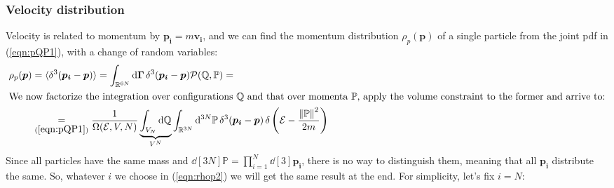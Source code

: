 \documentclass[../template.tex]{subfiles}
\begin{document}
\subsubsection{Velocity distribution} 
Velocity is related to momentum by $\bm{p_i} = m \bm{v_i}$, and we can find the momentum distribution $\rho_p(\bm{p})$ of a single particle from the joint pdf in (\ref{eqn:pQP1}), with a change of random variables:
\begin{align}\nonumber
    \rho_p(\bm{p}) &= \langle \delta^3 (\bm{p_i} - \bm{p}) \rangle = \int_{\mathbb{R}^{6N}} \dd{\bm{\Gamma}} \delta^3 (\bm{p_i} - \bm{p}) \mathcal{P}(\mathbb{Q}, \mathbb{P}) =\\
    \shortintertext{We now factorize the integration over configurations $\mathbb{Q}$ and that over momenta $\mathbb{P}$, apply the volume constraint to the former and arrive to:}
    &\underset{(\ref{eqn:pQP1})}{=}  \frac{1}{\Omega(\mathcal{E}, V, N)} \underbrace{\int_{V_N} \dd{\mathbb{Q}}}_{V^N}  \int_{\mathbb{R}^{3N}} \dd[3N]{\mathbb{P}} \delta^3(\bm{p_i} - \bm{p})\, \delta\left(\mathcal{E}-\frac{\norm{\mathbb{P}}^2}{2m} \right) \label{eqn:rhop2}
\end{align}
Since all particles have the same mass and $\dd[3N]{\mathbb{P}} = \prod_{i=1}^N \dd[3]{\bm{p_i}}$, there is no way to distinguish them, meaning that all $\bm{p_i}$ distribute the same. So, whatever $i$ we choose in (\ref{eqn:rhop2}) we will get the same result at the end. For simplicity, let's fix $i = N$:
\end{document}
